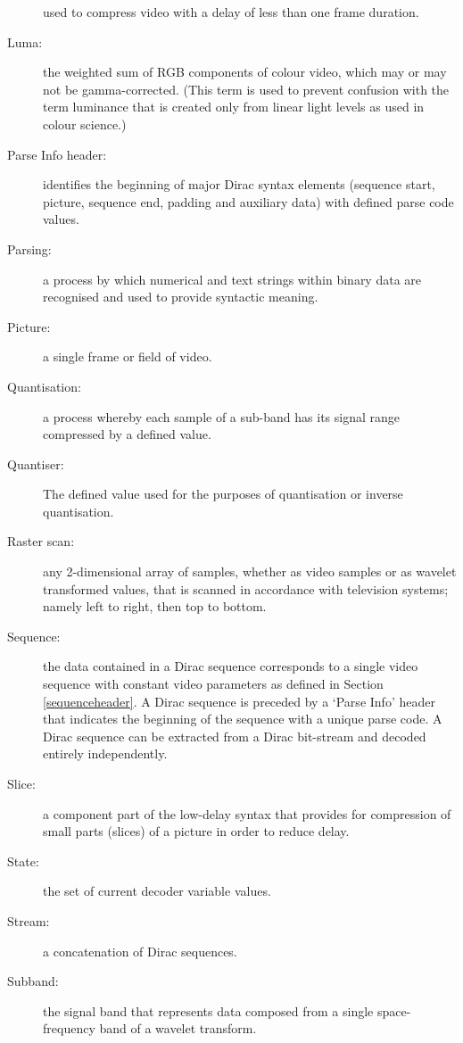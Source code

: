\begin{description}
used to compress video with a delay of less than one frame duration.
\item[Luma:] the weighted sum of RGB components of colour video, which may or 
may not be gamma-corrected. (This term is used to prevent confusion with the 
term luminance that is created only from linear light levels as used in colour 
science.)
\item[Parse Info header:] identifies the beginning of major Dirac syntax 
elements (sequence start, picture, sequence end, padding and auxiliary data) 
with defined parse code values.
\item[Parsing:] a process by which numerical and text strings within binary data
 are recognised and used to provide syntactic meaning.
\item[Picture:] a single frame or field of video.
\item[Quantisation:] a process whereby each sample of a sub-band has its signal
 range compressed by a defined value. 
\item[Quantiser:] The defined value used for the purposes of quantisation or 
inverse quantisation.
\item[Raster scan:] any 2-dimensional array of samples, whether as video samples
 or as wavelet transformed values, that is scanned in accordance with television
 systems; namely left to right, then top to bottom.
\item[Sequence:] the data contained in a Dirac sequence corresponds to a single
video sequence with constant video parameters as defined in Section 
\ref{sequenceheader}. A 
Dirac sequence is preceded by a `Parse Info' header that indicates the beginning
 of the sequence with a unique parse code. A Dirac sequence can be extracted 
from a Dirac bit-stream and decoded entirely independently.
\item[Slice:] a component part of the low-delay syntax that provides for 
compression of small parts (slices) of a picture in order to reduce delay. 
\item[State:] the set of current decoder variable values.
\item[Stream:] a concatenation of Dirac sequences.
\item[Subband:] the signal band that represents data composed from a single 
space-frequency band of a wavelet transform.
\end{description}
